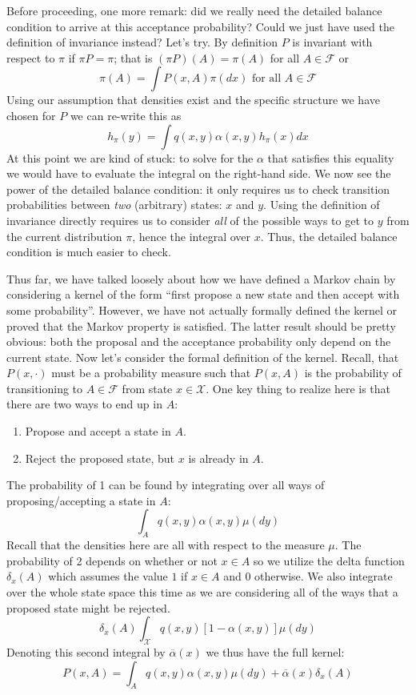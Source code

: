 \documentclass[12pt]{article}
\begin{document}
Before proceeding, one more remark: did we really need the detailed balance condition to arrive at this acceptance probability? Could we just have used the definition of invariance instead?
Let's try. By definition $P$ is invariant with respect to $\pi$ if $\pi P = \pi$; that is $(\pi P)(A) = \pi(A)$ for all $A \in \mathcal{F}$ or 
\[\pi(A) = \int P(x, A) \pi(dx) \text{ for all } A \in \mathcal{F}\]
Using our assumption that densities exist and the specific structure we have chosen for $P$ we can re-write this as
\[h_\pi(y) = \int q(x, y) \alpha(x, y) h_\pi(x) dx\]
At this point we are kind of stuck: to solve for the $\alpha$ that satisfies this equality we would have to evaluate the integral on the right-hand side. We now see the power 
of the detailed balance condition: it only requires us to check transition probabilities between \textit{two} (arbitrary) states: $x$ and $y$. Using the definition of invariance
directly requires us to consider \textit{all} of the possible ways to get to $y$ from the current distribution $\pi$, hence the integral over $x$. Thus, the detailed balance condition
is much easier to check. 

Thus far, we have talked loosely about how we have defined a Markov chain by considering a kernel of the form ``first propose a new state and then accept with some 
probability''. However, we have not actually formally defined the kernel or proved that the Markov property is satisfied. The latter result should be pretty obvious: both the 
proposal and the acceptance probability only depend on the current state. Now let's consider the formal definition of the kernel. Recall, that $P(x, \cdot)$ must be a probability 
measure such that $P(x, A)$ is the probability of transitioning to $A \in \mathcal{F}$ from state $x \in \mathcal{X}$. One key thing to realize here is that there are two ways 
to end up in $A$: 
\begin{enumerate} 
\item Propose and accept a state in $A$. 
\item Reject the proposed state, but $x$ is already in $A$. 
\end{enumerate}
The probability of 1 can be found by integrating over all ways of proposing/accepting a state in $A$: 
\[\int_{A} q(x, y)\alpha(x, y)\mu(dy)\]
Recall that the densities here are all with respect to the measure $\mu$. The probability of 2 depends on whether or not $x \in A$ so we utilize the delta function 
$\delta_x(A)$ which assumes the value $1$ if $x \in A$ and $0$ otherwise. We also integrate over the whole state space this time as we are considering all of the ways
that a proposed state might be rejected. 
\[\delta_x(A)\int_\mathcal{X} q(x, y)[1 - \alpha(x, y)]\mu(dy)\]
Denoting this second integral by $\overline{\alpha}(x)$ we thus have the full kernel: 
\[P(x, A) = \int_{A} q(x, y)\alpha(x, y)\mu(dy) + \overline{\alpha}(x) \delta_x(A)\]
\end{document}
